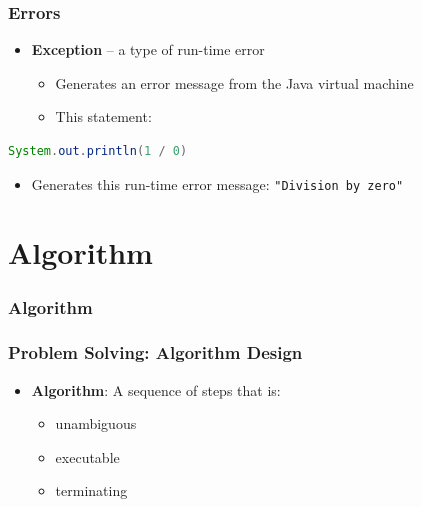 \documentclass{beamer}
\begin{document}
\begin{frame}[t,fragile] \frametitle{Errors} %
    \begin{itemize}
        \item \textbf{Exception} -- a type of run-time error
        \begin{itemize}
            \item Generates an error message from the Java virtual machine
            \item This statement:
        \end{itemize}
    \end{itemize}
\begin{lstlisting}[language=Java]
System.out.println(1 / 0)
\end{lstlisting}
    \begin{itemize}
        \item Generates this run-time error message: \texttt{"Division by zero"}
    \end{itemize}
\end{frame}

\section{Algorithm}

\begin{frame}[t,fragile] \frametitle{Algorithm} %
\end{frame}

\begin{frame}[t,fragile] \frametitle{Problem Solving: Algorithm Design} %
    \begin{itemize}
        \item \textbf{Algorithm}: A sequence of steps that is:
        \begin{itemize}
            \item unambiguous
            \item executable
            \item terminating
        \end{itemize}
    \end{itemize}
\end{frame}
\end{document}
